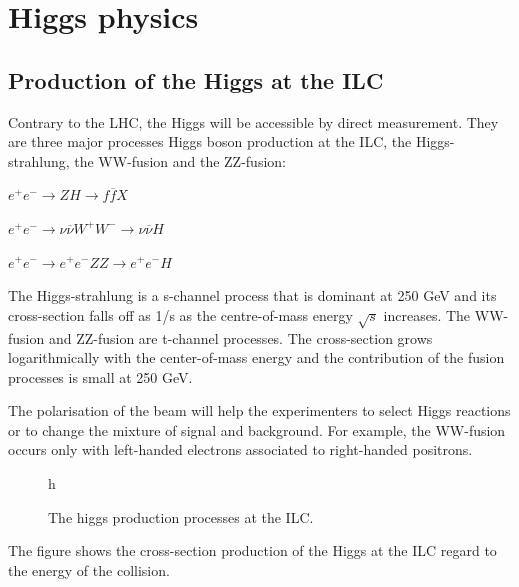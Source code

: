   \section{Higgs physics}

  \subsection{Production of the Higgs at the ILC}

  Contrary to the LHC, the Higgs will be accessible by direct measurement. 
  They are three major processes Higgs boson production at the ILC, the Higgs-strahlung, the WW-fusion and the ZZ-fusion:

  \begin{description}
    \centering
    \item[Higgs-strahlung:] $e^+e^- \rightarrow ZH \rightarrow f\overline{f}X$
    \item[WW-fusion:] $e^+e^- \rightarrow \nu \overline{\nu} W^+W^- \rightarrow \nu \overline{\nu} H$
    \item[ZZ-fusion:] $e^+e^- \rightarrow e^+e^- ZZ \rightarrow e^+e^- H$
  \end{description}

  The Higgs-strahlung is a s-channel process that is dominant at 250 GeV and its cross-section falls off as 1/s as the centre-of-mass energy $\sqrt{s}$ increases.
  The WW-fusion and ZZ-fusion are t-channel processes. 
  The cross-section grows logarithmically with the center-of-mass energy and the contribution of the fusion processes is small at 250 GeV.

  The polarisation of the beam will help the experimenters to select Higgs reactions or to change the mixture of signal and background.
  For example, the WW-fusion occurs only with left-handed electrons associated to right-handed positrons. 


  \begin{figure}{h}
    \centering
    \caption{The higgs production processes at the ILC.}
    \label{fig:higgsProd}
  \end{figure}

  The figure  shows the cross-section production of the Higgs at the ILC regard to the energy of the collision.
  
